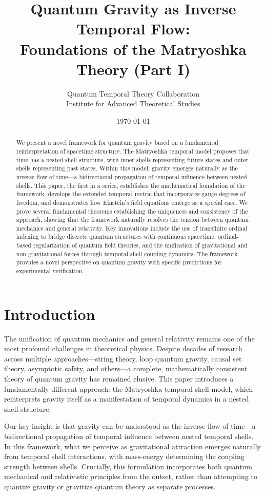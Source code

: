 \documentclass[12pt,a4paper]{article}
\title{Quantum Gravity as Inverse Temporal Flow: \\
Foundations of the Matryoshka Theory (Part I)}
\author{Quantum Temporal Theory Collaboration\\
Institute for Advanced Theoretical Studies}
\date{\today}
\begin{document}
\maketitle

\begin{abstract}
We present a novel framework for quantum gravity based on a fundamental reinterpretation of spacetime structure. The Matryoshka temporal model proposes that time has a nested shell structure, with inner shells representing future states and outer shells representing past states. Within this model, gravity emerges naturally as the inverse flow of time—a bidirectional propagation of temporal influence between nested shells. This paper, the first in a series, establishes the mathematical foundation of the framework, develops the extended temporal metric that incorporates gauge degrees of freedom, and demonstrates how Einstein's field equations emerge as a special case. We prove several fundamental theorems establishing the uniqueness and consistency of the approach, showing that the framework naturally resolves the tension between quantum mechanics and general relativity. Key innovations include the use of transfinite ordinal indexing to bridge discrete quantum structures with continuous spacetime, ordinal-based regularization of quantum field theories, and the unification of gravitational and non-gravitational forces through temporal shell coupling dynamics. The framework provides a novel perspective on quantum gravity with specific predictions for experimental verification.
\end{abstract}

\section{Introduction}

The unification of quantum mechanics and general relativity remains one of the most profound challenges in theoretical physics. Despite decades of research across multiple approaches—string theory, loop quantum gravity, causal set theory, asymptotic safety, and others—a complete, mathematically consistent theory of quantum gravity has remained elusive. This paper introduces a fundamentally different approach: the Matryoshka temporal shell model, which reinterprets gravity itself as a manifestation of temporal dynamics in a nested shell structure.

Our key insight is that gravity can be understood as the inverse flow of time—a bidirectional propagation of temporal influence between nested temporal shells. In this framework, what we perceive as gravitational attraction emerges naturally from temporal shell interactions, with mass-energy determining the coupling strength between shells. Crucially, this formulation incorporates both quantum mechanical and relativistic principles from the outset, rather than attempting to quantize gravity or gravitize quantum theory as separate processes.
\end{document}
